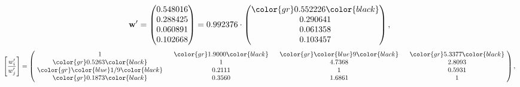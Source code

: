 \begin{example}
\begin{equation*}
\mathbf{w}^{\prime} =
\begin{pmatrix}
0.548016\\
0.288425\\
0.060891\\
0.102668
\end{pmatrix} =
0.992376\cdot
\begin{pmatrix}
\color{gr} 0.552226\color{black} \\
0.290641\\
0.061358\\
0.103457
\end{pmatrix},
\end{equation*}
\begin{equation*}
\left[ \frac{{w}^{\prime}_i}{{w}^{\prime}_j} \right] =
\begin{pmatrix}
$\,\,$ 1 $\,\,$ & $\,\,$\color{gr} 1.9000\color{black} $\,\,$ & $\,\,$\color{gr} \color{blue} 9\color{black} $\,\,$ & $\,\,$\color{gr} 5.3377\color{black} $\,\,$ \\
$\,\,$\color{gr} 0.5263\color{black} $\,\,$ & $\,\,$ 1 $\,\,$ & $\,\,$4.7368$\,\,$ & $\,\,$2.8093  $\,\,$ \\
$\,\,$\color{gr} \color{blue}  1/9\color{black} $\,\,$ & $\,\,$0.2111$\,\,$ & $\,\,$ 1 $\,\,$ & $\,\,$0.5931 $\,\,$ \\
$\,\,$\color{gr} 0.1873\color{black} $\,\,$ & $\,\,$0.3560$\,\,$ & $\,\,$1.6861$\,\,$ & $\,\,$ 1  $\,\,$ \\
\end{pmatrix},
\end{equation*}
\end{example}
\newpage
